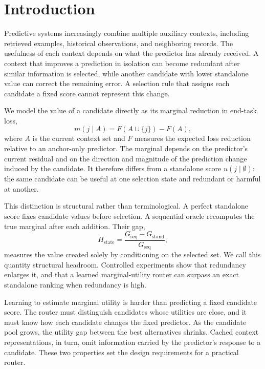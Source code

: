 \section{Introduction}

Predictive systems increasingly combine multiple auxiliary contexts, including
retrieved examples, historical observations, and neighboring records. The
usefulness of each context depends on what the predictor has already received.
A context that improves a prediction in isolation can become redundant after
similar information is selected, while another candidate with lower standalone
value can correct the remaining error. A selection rule that assigns each
candidate a fixed score cannot represent this change.

We model the value of a candidate directly as its marginal reduction in
end-task loss,
\begin{equation}
 m(j\mid A)=F(A\cup\{j\})-F(A),
\end{equation}
where $A$ is the current context set and $F$ measures the expected loss
reduction relative to an anchor-only predictor. The marginal depends on the
predictor's current residual and on the direction and magnitude of the
prediction change induced by the candidate. It therefore differs from a
standalone score $u(j\mid\emptyset)$: the same candidate can be useful at one
selection state and redundant or harmful at another.

This distinction is structural rather than terminological. A perfect
standalone score fixes candidate values before selection. A sequential oracle
recomputes the true marginal after each addition. Their gap,
\begin{equation}
 H_{\mathrm{state}}
 =
 \frac{G_{\mathrm{seq}}-G_{\mathrm{stand}}}{G_{\mathrm{seq}}},
\end{equation}
measures the value created solely by conditioning on the selected set. We
call this quantity structural headroom. Controlled experiments show that
redundancy enlarges it, and that a learned marginal-utility router can surpass
an exact standalone ranking when redundancy is high.

Learning to estimate marginal utility is harder than predicting a fixed
candidate score. The router must distinguish candidates whose utilities are
close, and it must know how each candidate changes the fixed predictor. As the
candidate pool grows, the utility gap between the best alternatives shrinks.
Cached context representations, in turn, omit information carried by the
predictor's response to a candidate. These two properties set the design
requirements for a practical router.

